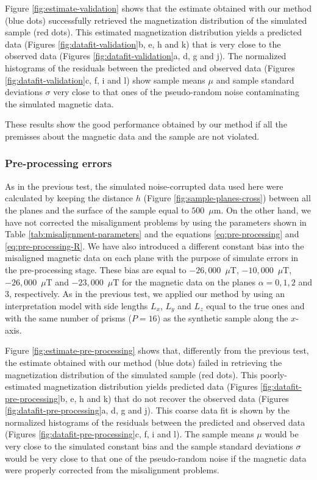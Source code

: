 \documentclass[draft,gc]{agutex}
\begin{document}
\begin{article}
Figure \ref{fig:estimate-validation} shows that the estimate
obtained with our method (blue dots) successfully retrieved the 
magnetization distribution of the simulated sample (red dots).
This estimated magnetization distribution yields a predicted data
(Figures \ref{fig:datafit-validation}b, e, h and k) that is very
close to the observed data (Figures \ref{fig:datafit-validation}a, 
d, g and j).
The normalized histograms of the residuals between the predicted and
observed data (Figures \ref{fig:datafit-validation}c, f, i and l) show
sample means $\mu$ and sample standard deviations $\sigma$
very close to that ones of the pseudo-random noise 
contaminating the simulated magnetic data.

These results show the good performance obtained by our method
if all the premisses about the magnetic data and the sample 
are not violated.

\subsubsection{Pre-processing errors}

As in the previous test, the simulated noise-corrupted data 
used here were calculated by keeping the distance $h$ (Figure 
\ref{fig:sample-planes-cross}) between all the planes and the 
surface of the sample equal to $500$~$\mu$m.
On the other hand, we have not corrected the misalignment 
problems by using the parameters shown in 
Table \ref{tab:misalignment-parameters} and the equations 
\ref{eq:pre-processing} and \ref{eq:pre-processing-R}.
We have also introduced a different constant bias into the 
misaligned magnetic data on each plane with the purpose of
simulate errors in the pre-processing stage. These bias are
equal to $-26,000$~$\mu$T, $-10,000$~$\mu$T, $-26,000$~$\mu$T
and $-23,000$~$\mu$T for the magnetic data on the planes
$\alpha = 0, 1, 2$ and $3$, respectively.
As in the previous test, we applied our method by using
an interpretation model with side lengths $L_{x}$, $L_{y}$ 
and $L_{z}$ equal to the true ones and with the same number 
of prisms ($P = 16$) as the synthetic sample along the $x$-axis.

Figure \ref{fig:estimate-pre-processing} shows that,
differently from the previous test, 
the estimate obtained with our method (blue dots) failed in
retrieving the magnetization distribution of the simulated sample
(red dots).
This poorly-estimated magnetization distribution yields 
predicted data (Figures \ref{fig:datafit-pre-processing}b, e, h and k) 
that do not
recover the observed data (Figures \ref{fig:datafit-pre-processing}a, 
d, g and j).
This coarse data fit is shown by the normalized histograms of 
the residuals between the predicted and
observed data (Figures \ref{fig:datafit-pre-processing}c, f, i and l).
The sample means $\mu$ would be very close to the simulated 
constant bias and the sample standard deviations $\sigma$ would
be very close to that one of the pseudo-random noise 
if the magnetic data were properly corrected from
the misalignment problems.


\end{article}
\end{document}
